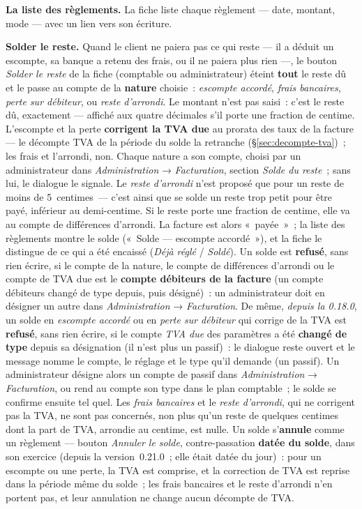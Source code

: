 \documentclass[a4paper,11pt,oneside]{article}
\begin{document}
\textbf{La liste des règlements.} La fiche liste chaque règlement --- date, montant, mode --- avec
un lien vers son écriture.

\textbf{Solder le reste.} Quand le client ne paiera pas ce qui reste --- il a déduit un escompte,
sa banque a retenu des frais, ou il ne paiera plus rien ---, le bouton \emph{Solder le reste} de la
fiche (comptable ou administrateur) éteint \textbf{tout} le reste dû et le passe au compte de la
\textbf{nature} choisie~: \emph{escompte accordé}, \emph{frais bancaires}, \emph{perte sur
débiteur}, ou \emph{reste d'arrondi}. Le montant n'est pas saisi~: c'est le reste dû, exactement
--- affiché aux quatre décimales s'il porte une fraction de centime. L'escompte et la perte \textbf{corrigent la TVA due} au prorata des taux de la facture --- le
décompte TVA de la période du solde la retranche (\S\ref{sec:decompte-tva})~; les
frais et l'arrondi, non. Chaque nature a son compte, choisi par un administrateur dans
\emph{Administration} → \emph{Facturation}, section \emph{Solde du reste}~; sans lui, le dialogue le
signale. Le \emph{reste d'arrondi} n'est proposé que pour un reste de moins de 5~centimes~--- c'est
ainsi que se solde un reste trop petit pour être payé, inférieur au demi-centime. Si le reste porte
une fraction de centime, elle va au compte de différences d'arrondi. La facture est alors
«~payée~»~; la liste des règlements montre le solde («~Solde --- escompte accordé~»), et la fiche le
distingue de ce qui a été encaissé (\emph{Déjà réglé} / \emph{Soldé}). Un solde est
\textbf{refusé}, sans rien écrire, si le compte de la nature, le compte de différences d'arrondi
ou le compte de TVA due est le \textbf{compte débiteurs de la facture} (un compte débiteurs
changé de type depuis, puis désigné)~: un administrateur doit en désigner un autre dans
\emph{Administration} → \emph{Facturation}. De même, \emph{depuis la 0.18.0}, un solde en
\emph{escompte accordé} ou en \emph{perte sur débiteur} qui corrige de la TVA est
\textbf{refusé}, sans rien écrire, si le compte \emph{TVA due} des paramètres a été
\textbf{changé de type} depuis sa désignation (il n'est plus un passif)~: le dialogue reste
ouvert et le message nomme le compte, le réglage et le type qu'il demande (un passif). Un
administrateur désigne alors un compte de passif dans \emph{Administration} →
\emph{Facturation}, ou rend au compte son type dans le plan comptable~; le solde se confirme
ensuite tel quel. Les \emph{frais bancaires} et le \emph{reste d'arrondi}, qui ne corrigent pas la
TVA, ne sont pas concernés, non plus qu'un reste de quelques centimes dont la part de TVA,
arrondie au centime, est nulle. Un solde s'\textbf{annule}
comme un règlement --- bouton \emph{Annuler le solde}, contre-passation \textbf{datée du solde},
dans son exercice (depuis la version~0.21.0~; elle était datée du jour)~: pour un escompte ou une
perte, la TVA est comprise, et la correction de TVA est reprise dans la période même du solde~;
les frais bancaires et le reste d'arrondi n'en portent pas, et leur annulation ne change aucun
décompte de TVA.
\end{document}

